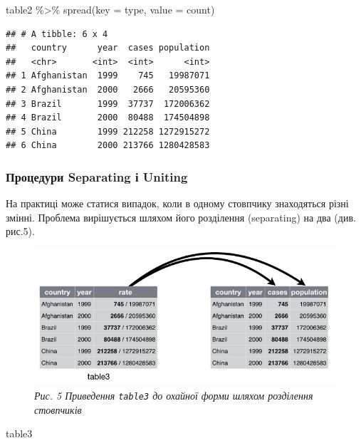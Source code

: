\documentclass[
]{book}
\newenvironment{Shaded}{\begin{snugshade}}{\end{snugshade}}
\newcommand{\AttributeTok}[1]{\textcolor[rgb]{0.77,0.63,0.00}{#1}}
\newcommand{\FunctionTok}[1]{\textcolor[rgb]{0.00,0.00,0.00}{#1}}
\newcommand{\NormalTok}[1]{#1}
\newcommand{\SpecialCharTok}[1]{\textcolor[rgb]{0.00,0.00,0.00}{#1}}
\begin{document}
\begin{Shaded}
\begin{Highlighting}[]
\NormalTok{table2 }\SpecialCharTok{\%\textgreater{}\%}
    \FunctionTok{spread}\NormalTok{(}\AttributeTok{key =}\NormalTok{ type, }\AttributeTok{value =}\NormalTok{ count)}
\end{Highlighting}
\end{Shaded}

\begin{verbatim}
## # A tibble: 6 x 4
##   country      year  cases population
##   <chr>       <int>  <int>      <int>
## 1 Afghanistan  1999    745   19987071
## 2 Afghanistan  2000   2666   20595360
## 3 Brazil       1999  37737  172006362
## 4 Brazil       2000  80488  174504898
## 5 China        1999 212258 1272915272
## 6 China        2000 213766 1280428583
\end{verbatim}

\hypertarget{ux43fux440ux43eux446ux435ux434ux443ux440ux438-separating-ux456-uniting}{%
\subsubsection{Процедури Separating і Uniting}\label{ux43fux440ux43eux446ux435ux434ux443ux440ux438-separating-ux456-uniting}}

На практиці може статися випадок, коли в одному стовпчику знаходяться різні змінні. Проблема вирішується шляхом його розділення (separating) на два (див. рис.5).

\begin{figure}
\centering
\includegraphics{image/table3.png}
\caption{\emph{Рис. 5 Приведення \texttt{table3} до охайної форми шляхом розділення стовпчиків}}
\end{figure}

\begin{Shaded}
\begin{Highlighting}[]
\NormalTok{table3}
\end{Highlighting}
\end{Shaded}
\end{document}
